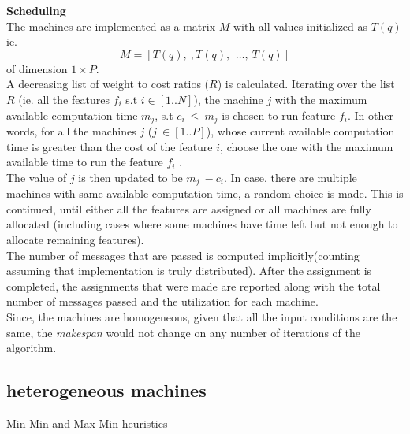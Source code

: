 \documentclass[10pt, conference, compsocconf]{IEEEtran}
\begin{document}
\textbf{Scheduling}\\
The machines are implemented as a matrix $M$ with all values initialized as $T(q)$ ie. $$M =[T(q),\ ,T(q),\, \ \dots,\ T(q)]$$ of dimension $1\times P$.\\
 A decreasing list of weight to cost ratios ($R$) is calculated. Iterating over the list $R$ (ie. all the features $f_i$ s.t $i\in[1 .. N]$), the machine $j$ with the maximum available computation time $m_j$,  s.t $c_i\ \leq\ m_j$ is chosen to run feature $f_i$. In other words, for all the machines $j$ ($j\ \in [1..P]$), whose current available computation time is greater than the cost of the feature $i$, choose the one with the maximum available time to run the feature $f_i$ . \\
The value of $j$ is then updated to be $m_j\ - c_i$. In case, there are multiple machines with same available computation time, a random choice is made. This is continued, until either all the features are assigned or all machines are fully allocated (including cases where some machines have time left but not enough to allocate remaining features).\\
The number of messages that are passed is computed implicitly(counting assuming that implementation is truly distributed). After the assignment is completed, the assignments that were made are reported along with the total number of messages passed and the utilization for each machine. \\
Since, the machines are homogeneous, given that all the input conditions are the same, the \textit{makespan} would not change on any number of iterations of the algorithm.\\




\subsection{heterogeneous machines}
Min-Min and Max-Min heuristics

{\tiny
\newcommand{\BIBdecl}{\setlength{\itemsep}{0.2 em}}


}

\end{document}

